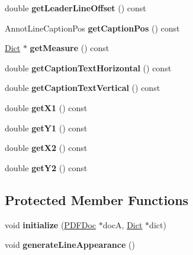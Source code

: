 \begin{DoxyCompactItemize}
\item 
\mbox{\label{class_annot_line_a1f45acb3a611f7dfd0533538913b0b32}} 
double {\bfseries get\+Leader\+Line\+Offset} () const
\item 
\mbox{\label{class_annot_line_a4ebf9a781a01d1d0cf393b6a3c3f6d01}} 
Annot\+Line\+Caption\+Pos {\bfseries get\+Caption\+Pos} () const
\item 
\mbox{\label{class_annot_line_adab63eac218ae633313eb602d54565f1}} 
\hyperlink{class_dict}{Dict} $\ast$ {\bfseries get\+Measure} () const
\item 
\mbox{\label{class_annot_line_a238b045fbf9a2aa1fd1cb746e0282cde}} 
double {\bfseries get\+Caption\+Text\+Horizontal} () const
\item 
\mbox{\label{class_annot_line_a8c50eff14ff31c8430fe2f77f9cd9a6a}} 
double {\bfseries get\+Caption\+Text\+Vertical} () const
\item 
\mbox{\label{class_annot_line_ae4360a175fecd084c0dcc74b4fcf782c}} 
double {\bfseries get\+X1} () const
\item 
\mbox{\label{class_annot_line_a844082629db547c2c151f0882841d065}} 
double {\bfseries get\+Y1} () const
\item 
\mbox{\label{class_annot_line_a357bf7650681eb832cec57504798f423}} 
double {\bfseries get\+X2} () const
\item 
\mbox{\label{class_annot_line_ad4f432efa64627aebab9684fc5b2e871}} 
double {\bfseries get\+Y2} () const
\end{DoxyCompactItemize}
\subsection*{Protected Member Functions}
\begin{DoxyCompactItemize}
\item 
\mbox{\label{class_annot_line_aa39ad8f147b904cd85e88a7aaf891496}} 
void {\bfseries initialize} (\hyperlink{class_p_d_f_doc}{P\+D\+F\+Doc} $\ast$docA, \hyperlink{class_dict}{Dict} $\ast$dict)
\item 
\mbox{\label{class_annot_line_aafa1787745321b243fbdef3be1a64bf6}} 
void {\bfseries generate\+Line\+Appearance} ()
\end{DoxyCompactItemize}
